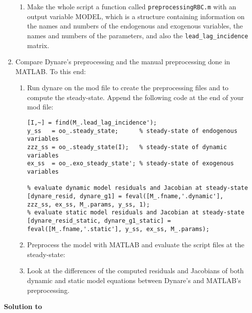\begin{enumerate}
\begin{enumerate}
  \item
  Make the whole script a function called \texttt{preprocessingRBC.m}
    with an output variable MODEL,
	which is a structure containing information on the names
	and numbers of the endogenous and exogenous variables,
	the names and numbers of the parameters,
	and also the \texttt{lead\_lag\_incidence} matrix.

\end{enumerate}

\item Compare Dynare's preprocessing and the manual preprocessing done in MATLAB.\@
To this end:

\begin{enumerate}
  \item
  Run dynare on the mod file to create the preprocessing files
	and to compute the steady-state.
  Append the following code at the end of your mod file:
\begin{lstlisting}[style=Matlab-editor,basicstyle=\mlttfamily\scriptsize]
% create steady-state vectors
[I,~] = find(M_.lead_lag_incidence');
y_ss   = oo_.steady_state;      % steady-state of endogenous variables
zzz_ss = oo_.steady_state(I);   % steady-state of dynamic variables
ex_ss  = oo_.exo_steady_state'; % steady-state of exogenous variables

% evaluate dynamic model residuals and Jacobian at steady-state
[dynare_resid, dynare_g1] = feval([M_.fname,'.dynamic'], zzz_ss, ex_ss, M_.params, y_ss, 1);
% evaluate static model residuals and Jacobian at steady-state
[dynare_resid_static, dynare_g1_static] = feval([M_.fname,'.static'], y_ss, ex_ss, M_.params);
\end{lstlisting}

  \item
  Preprocess the model with MATLAB and evaluate the script files at the steady-state:

  \item
  Look at the differences of the computed residuals
    and Jacobians of both dynamic and static model equations
	between Dynare's and MATLAB's preprocessing.

\end{enumerate}

\end{enumerate}


\begin{solution}\textbf{Solution to }
\ifDisplaySolutions%

\fi
\newpage
\end{solution}